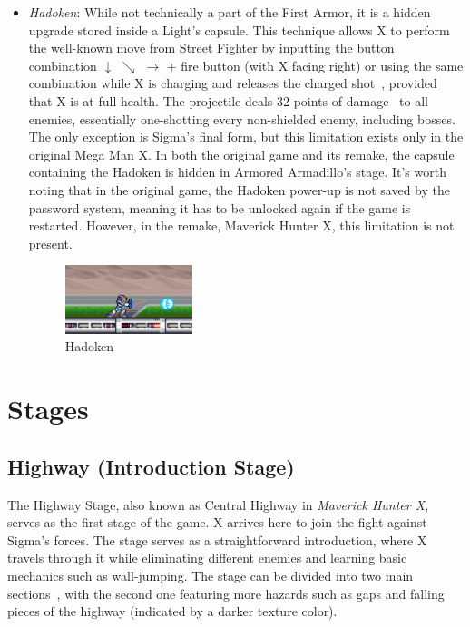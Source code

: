 \begin{itemize}
\item \emph{Hadoken}: While not technically a part of the First Armor, it is a hidden upgrade stored inside a Light's capsule. This technique allows X to perform the well-known move from Street Fighter by inputting the button combination $\downarrow$ $\searrow$ $\rightarrow$ + fire button  (with X facing right)  or using the same combination while X is charging and releases the charged shot~\cite{RTA_wiki:X1}, provided that X is at full health. The projectile deals 32 points of damage~\cite{wiki:Hadoken} to all enemies, essentially one-shotting every non-shielded enemy, including bosses. The only exception is Sigma's final form, but this limitation exists only in the original Mega Man X. In both the original game and its remake, the capsule containing the Hadoken is hidden in Armored Armadillo's stage. It's worth noting that in the original game, the Hadoken power-up is not saved by the password system, meaning it has to be unlocked again if the game is restarted. However, in the remake, Maverick Hunter X, this limitation is not present.
\begin{figure}[htp]
	\centering
	\includegraphics[height=2cm]{figures/X1/weapons/Hadoken.jpg}
	\caption{Hadoken}
\end{figure}

\end{itemize}

\chapter{Stages}

\section{Highway (Introduction Stage)}

The Highway Stage, also known as Central Highway in \textit{Maverick Hunter X}, serves as the first stage of the game. X arrives here to join the fight against Sigma's forces. The stage serves as a straightforward introduction, where X travels through it while eliminating different enemies and learning basic mechanics such as wall-jumping. The stage can be divided into two main sections~\cite{stratwiki:HighWay}, with the second one featuring more hazards such as gaps and falling pieces of the highway (indicated by a darker texture color).

